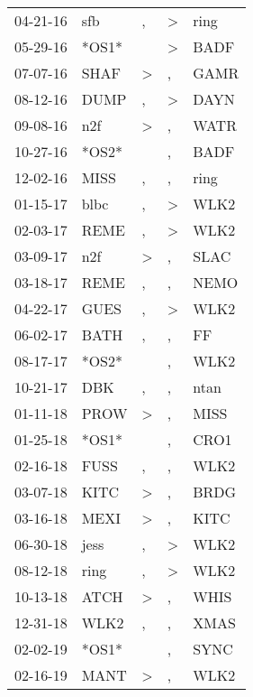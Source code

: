 \begin{supertabular}{lllll}
 04-21-16 &    sfb &             , &  \textgreater &   ring \\
 05-29-16 &  *OS1* &               &  \textgreater &   BADF \\
 07-07-16 &   SHAF &  \textgreater &             , &   GAMR \\
 08-12-16 &   DUMP &             , &  \textgreater &   DAYN \\
 09-08-16 &    n2f &  \textgreater &             , &   WATR \\
 10-27-16 &  *OS2* &               &             , &   BADF \\
 12-02-16 &   MISS &             , &             , &   ring \\
 01-15-17 &   blbc &             , &  \textgreater &   WLK2 \\
 02-03-17 &   REME &             , &  \textgreater &   WLK2 \\
 03-09-17 &    n2f &  \textgreater &             , &   SLAC \\
 03-18-17 &   REME &             , &             , &   NEMO \\
 04-22-17 &   GUES &             , &  \textgreater &   WLK2 \\
 06-02-17 &   BATH &             , &             , &     FF \\
 08-17-17 &  *OS2* &               &             , &   WLK2 \\
 10-21-17 &    DBK &             , &             , &   ntan \\
 01-11-18 &   PROW &  \textgreater &             , &   MISS \\
 01-25-18 &  *OS1* &               &             , &   CRO1 \\
 02-16-18 &   FUSS &             , &             , &   WLK2 \\
 03-07-18 &   KITC &  \textgreater &             , &   BRDG \\
 03-16-18 &   MEXI &  \textgreater &             , &   KITC \\
 06-30-18 &   jess &             , &  \textgreater &   WLK2 \\
 08-12-18 &   ring &             , &  \textgreater &   WLK2 \\
 10-13-18 &   ATCH &  \textgreater &             , &   WHIS \\
 12-31-18 &   WLK2 &             , &             , &   XMAS \\
 02-02-19 &  *OS1* &               &             , &   SYNC \\
 02-16-19 &   MANT &  \textgreater &             , &   WLK2 \\

\end{supertabular}
